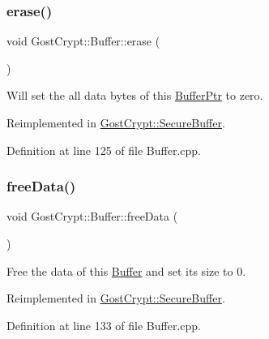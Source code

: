 \subsubsection{\texorpdfstring{erase()}{erase()}}
{\footnotesize\ttfamily void Gost\+Crypt\+::\+Buffer\+::erase (\begin{DoxyParamCaption}{ }\end{DoxyParamCaption})\hspace{0.3cm}{\ttfamily [virtual]}}



Will set the all data bytes of this \hyperlink{class_gost_crypt_1_1_buffer_ptr}{Buffer\+Ptr} to zero. 



Reimplemented in \hyperlink{class_gost_crypt_1_1_secure_buffer_a6b6ee17fb3f8f617112854f9d24e393a}{Gost\+Crypt\+::\+Secure\+Buffer}.



Definition at line 125 of file Buffer.\+cpp.

\mbox{\label{class_gost_crypt_1_1_buffer_af3b4e8576f58b4eb9bf3b0e819402db9}} 
\subsubsection{\texorpdfstring{free\+Data()}{freeData()}}
{\footnotesize\ttfamily void Gost\+Crypt\+::\+Buffer\+::free\+Data (\begin{DoxyParamCaption}{ }\end{DoxyParamCaption})\hspace{0.3cm}{\ttfamily [virtual]}}



Free the data of this \hyperlink{class_gost_crypt_1_1_buffer}{Buffer} and set its size to 0. 



Reimplemented in \hyperlink{class_gost_crypt_1_1_secure_buffer_a45e814bc17ed85b86733fffc32c69d28}{Gost\+Crypt\+::\+Secure\+Buffer}.



Definition at line 133 of file Buffer.\+cpp.

\mbox{\label{class_gost_crypt_1_1_buffer_acdba1753b368a81c686afb8584173e54}} 

